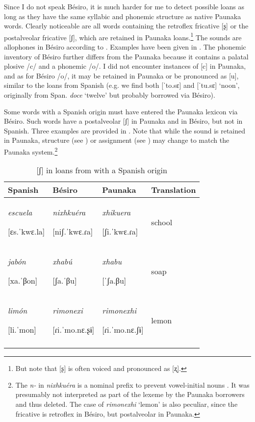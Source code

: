 Since I do not speak Bésiro, it is much harder for me to detect possible loans as long as they have the same syllabic and phonemic structure as native Paunaka words. Clearly noticeable are all words containing the retroflex fricative [ʂ] or the postalveolar fricative [ʃ], which are retained in Paunaka loans.\footnote{But note that [ʂ] is often voiced and pronounced as [ʐ].} The sounds are allophones in Bésiro  according to \citet[70]{Sans2010}. Examples have been given in . The phonemic inventory of Bésiro further differs from the Paunaka because it contains a palatal plosive /c/ and a phonemic /o/. I did not encounter instances of [c] in Paunaka, and as for Bésiro /o/, it may be retained in Paunaka or be pronounced as [u], similar to the loans from Spanish (e.g. we find both [ˈto.sɛ] and [ˈtu.sɛ] ‘noon’, originally from Span. \textit{doce} ‘twelve’ but probably borrowed via Bésiro).

Some words with a Spanish origin must have entered the Paunaka lexicon via Bésiro. Such words have a postalveolar [ʃ] in Paunaka and in Bésiro, but not in Spanish. Three examples are provided in . Note that while the sound is retained in Paunaka,  structure (see ) or  assignment (see ) may change to match the Paunaka system.\footnote{The \textit{n-} in  \textit{nixhkuéra} is a nominal prefix to prevent vowel-initial nouns \citep[cf.][20]{Sans2013}. It was presumably not interpreted as part of the lexeme by the Paunaka borrowers and thus deleted. The case of \textit{rimonexhi} ‘lemon’ is also peculiar, since the fricative is retroflex in Bésiro, but postalveolar in Paunaka.}


\begin{table}
\caption{[ʃ] in loans from  with a Spanish origin}

\begin{tabularx}{\textwidth}{QQQl}
\lsptoprule
Spanish & Bésiro & Paunaka & Translation\\
\midrule 
\textit{escuela}  

[ɛs.ˈkwɛ.la] & \textit{nixhkuéra} 

[niʃ.ˈkwɛ.ɾa] & \textit{xhikuera} 

[ʃi.ˈkwɛ.ɾa] & school\\
\tablevspace
 \textit{jabón}  
 
 [xa.ˈβon] & \textit{xhabú} 
 
 [ʃa.ˈβu]  &  \textit{xhabu} 
 
 [ˈʃa.βu] & soap\\
\tablevspace
 \textit{limón} 
 
 [li.ˈmon] &  \textit{rimonexi} 
 
 [ɾi.ˈmo.nɛ.ʂɨ] &  \textit{rimonexhi} 
 
 [ɾi.ˈmo.nɛ.ʃɨ] & lemon\\
\lspbottomrule
\end{tabularx}

\label{table:BesiroSpanishLoans}
\end{table}


